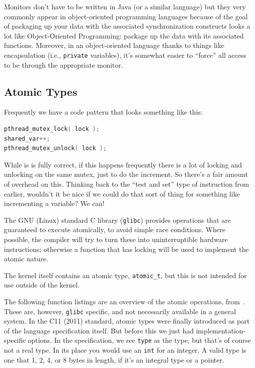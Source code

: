 \documentclass[a4paper]{report}
\begin{document}
Monitors don't have to be written in Java (or a similar language) but they very commonly appear in object-oriented programming languages because of the goal of packaging up your data with the associated synchronization constructs looks a lot like Object-Oriented Programming: package up the data with its associated functions. Moreover, in an object-oriented language thanks to things like encapsulation (i.e., \texttt{private} variables), it's somewhat easier to ``force'' all access to be through the appropriate monitor.

\subsection*{Atomic Types}

Frequently we have a code pattern that looks something like this:

\begin{lstlisting}[language=C]
pthread_mutex_lock( lock );
shared_var++;
pthread_mutex_unlock( lock );
\end{lstlisting}

While is is fully correct, if this happens frequently there is a lot of locking and unlocking on the same mutex, just to do the increment. So there's a fair amount of overhead on this. Thinking back to the ``test and set'' type of instruction from earlier, wouldn't it be nice if we could do that sort of thing for something like incrementing a variable? We can!

The GNU (Linux) standard C library (\texttt{glibc}) provides operations that are guaranteed to execute atomically, to avoid simple race conditions. Where possible, the compiler will try to turn these into uninterruptible hardware instructions; otherwise a function that has locking will be used to implement the atomic nature.

The kernel itself contains an atomic type, \texttt{atomic\_t}, but this is not intended for use outside of the kernel.

The following function listings are an overview of the atomic operations, from~\cite{gccatomic}. These are, however, \texttt{glibc} specific, and not necessarily available in a general system. In the C11 (2011) standard, atomic types were finally introduced as part of the language specification itself. But before this we just had implementation-specific options. In the specification, we see \texttt{type} as the type, but that's of course not a real type. In its place you would use an \texttt{int} for an integer. A valid type is one that 1, 2, 4, or 8 bytes in length, if it's an integral type or a pointer.
\end{document}
